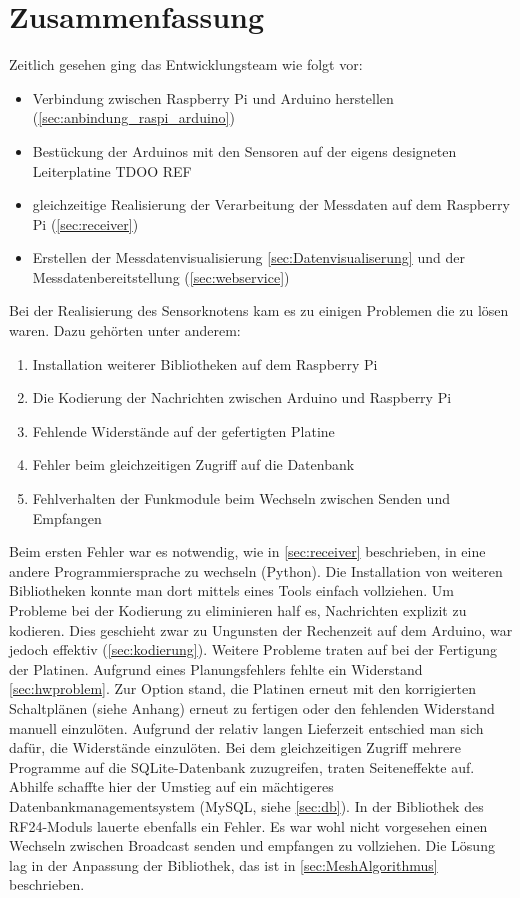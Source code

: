 \section{Zusammenfassung}
Zeitlich gesehen ging das Entwicklungsteam wie folgt vor:
\begin{itemize}
\item Verbindung zwischen Raspberry Pi und Arduino herstellen (\ref{sec:anbindung_raspi_arduino})
\item Bestückung der Arduinos mit den Sensoren auf der eigens designeten Leiterplatine TDOO REF
\item gleichzeitige Realisierung der Verarbeitung der Messdaten auf dem Raspberry Pi (\ref{sec:receiver})
\item Erstellen der Messdatenvisualisierung \ref{sec:Datenvisualiserung} und der Messdatenbereitstellung (\ref{sec:webservice}) 
\end{itemize}

Bei der Realisierung des Sensorknotens kam es zu einigen Problemen die zu lösen waren. Dazu gehörten unter anderem:
\begin{enumerate}
\item Installation weiterer Bibliotheken auf dem Raspberry Pi
\item Die Kodierung der Nachrichten zwischen Arduino und Raspberry Pi
\item Fehlende Widerstände auf der gefertigten Platine
\item Fehler beim gleichzeitigen Zugriff auf die Datenbank
\item Fehlverhalten der Funkmodule beim Wechseln zwischen Senden und Empfangen
\end{enumerate}

Beim ersten Fehler war es notwendig, wie in  \ref{sec:receiver} beschrieben, in eine andere Programmiersprache zu wechseln (Python). Die Installation von weiteren Bibliotheken konnte man dort mittels eines Tools einfach vollziehen. 
Um Probleme bei der Kodierung zu eliminieren half es, Nachrichten explizit zu kodieren. Dies geschieht zwar zu Ungunsten der Rechenzeit auf dem Arduino, war jedoch effektiv (\ref{sec:kodierung}). 
Weitere Probleme traten auf bei der Fertigung der Platinen. Aufgrund eines Planungsfehlers fehlte ein Widerstand \ref{sec:hwproblem}. Zur Option stand, die Platinen erneut mit den korrigierten Schaltplänen (siehe Anhang) erneut zu fertigen oder den fehlenden Widerstand manuell einzulöten. Aufgrund der relativ langen Lieferzeit entschied man sich dafür, die Widerstände einzulöten.
Bei dem gleichzeitigen Zugriff mehrere Programme auf die SQLite-Datenbank zuzugreifen, traten Seiteneffekte auf. Abhilfe schaffte hier der Umstieg auf ein mächtigeres Datenbankmanagementsystem (MySQL, siehe \ref{sec:db}).
In der Bibliothek des RF24-Moduls lauerte ebenfalls ein Fehler. Es war wohl nicht vorgesehen einen Wechseln zwischen Broadcast senden und empfangen zu vollziehen. Die Lösung lag in der Anpassung der Bibliothek, das ist in \ref{sec:MeshAlgorithmus} beschrieben.
